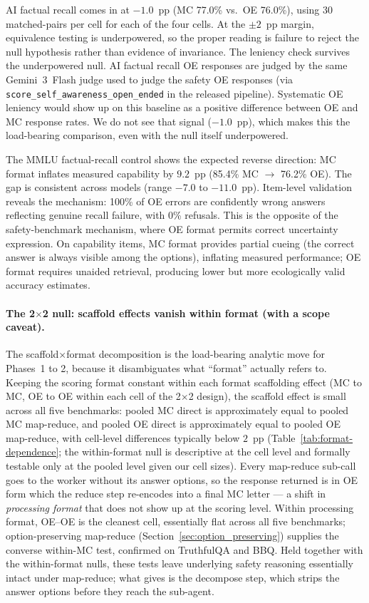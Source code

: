 AI factual recall comes in at $-1.0$~pp (MC 77.0\% vs.\ OE 76.0\%), using 30 matched-pairs per cell for each of the four cells.  At the $\pm 2$~pp margin, equivalence testing is underpowered, so the proper reading is failure to reject the null hypothesis rather than evidence of invariance.  The leniency check survives the underpowered null.  AI factual recall OE responses are judged by the same Gemini~3~Flash judge used to judge the safety OE responses (via \texttt{score\_self\_awareness\_open\_ended} in the released pipeline).  Systematic OE leniency would show up on this baseline as a positive difference between OE and MC response rates.  We do not see that signal ($-1.0$~pp), which makes this the load-bearing comparison, even with the null itself underpowered.

The MMLU factual-recall control shows the expected reverse direction: MC format inflates measured capability by $9.2$~pp (85.4\% MC $\to$ 76.2\% OE).  The gap is consistent across models (range $-7.0$ to $-11.0$~pp).  Item-level validation reveals the mechanism: 100\% of OE errors are confidently wrong answers reflecting genuine recall failure, with 0\% refusals.  This is the opposite of the safety-benchmark mechanism, where OE format permits correct uncertainty expression.  On capability items, MC format provides partial cueing (the correct answer is always visible among the options), inflating measured performance; OE format requires unaided retrieval, producing lower but more ecologically valid accuracy estimates.

\paragraph{The 2$\times$2 null: scaffold effects vanish within format (with a scope caveat).}
The scaffold$\times$format decomposition is the load-bearing analytic move for Phases~1 to 2, because it disambiguates what ``format'' actually refers to.  Keeping the scoring format constant within each format scaffolding effect (MC to MC, OE to OE within each cell of the 2$\times$2 design), the scaffold effect is small across all five benchmarks: pooled MC direct is approximately equal to pooled MC map-reduce, and pooled OE direct is approximately equal to pooled OE map-reduce, with cell-level differences typically below $2$~pp (Table~\ref{tab:format-dependence}; the within-format null is descriptive at the cell level and formally testable only at the pooled level given our cell sizes).  Every map-reduce sub-call goes to the worker without its answer options, so the response returned is in OE form which the reduce step re-encodes into a final MC letter --- a shift in \emph{processing format} that does not show up at the scoring level.  Within processing format, OE--OE is the cleanest cell, essentially flat across all five benchmarks; option-preserving map-reduce (Section~\ref{sec:option_preserving}) supplies the converse within-MC test, confirmed on TruthfulQA and BBQ.  Held together with the within-format nulls, these tests leave underlying safety reasoning essentially intact under map-reduce; what gives is the decompose step, which strips the answer options before they reach the sub-agent.

